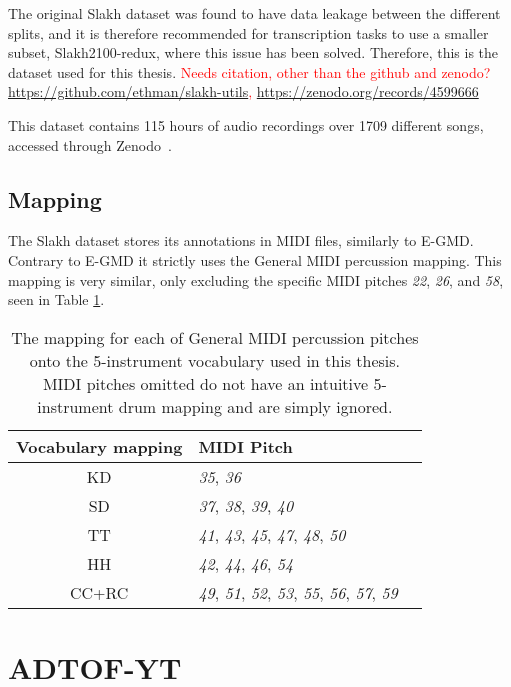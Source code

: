 The original Slakh dataset was found to have data leakage between the different splits, and it is therefore recommended for transcription tasks to use a smaller subset, Slakh2100-redux, where this issue has been solved. Therefore, this is the dataset used for this thesis.
\textcolor{red}{Needs citation, other than the github and zenodo? \\ \url{https://github.com/ethman/slakh-utils}, \url{https://zenodo.org/records/4599666}}

This dataset contains 115 hours of audio recordings over 1709 different songs, accessed through Zenodo~\cite{manilow_2019_4599666}.

\subsection{Mapping}

The Slakh dataset stores its annotations in MIDI files, similarly to E-GMD. Contrary to E-GMD it strictly uses the General MIDI percussion mapping. This mapping is very similar, only excluding the specific MIDI pitches \textit{22}, \textit{26}, and \textit{58}, seen in Table \ref{MIDIMapping}.

\begin{table}[H]
    \centering
    \hspace*{-0.6cm}
    \begin{tabular}{c|ll}
        Vocabulary mapping & MIDI Pitch \\
        \hline
        \acrfull{KD} & \textit{35}, \textit{36} \\
        \acrfull{SD} & \textit{37}, \textit{38}, \textit{39}, \textit{40} \\
        \acrfull{TT} & \textit{41}, \textit{43}, \textit{45}, \textit{47}, \textit{48}, \textit{50} \\
        \acrfull{HH} & \textit{42}, \textit{44}, \textit{46}, \textit{54} \\
        \acrfull{CC+RC} & \textit{49}, \textit{51}, \textit{52}, \textit{53}, \textit{55}, \textit{56}, \textit{57}, \textit{59} \\
    \end{tabular}
    \caption{The mapping for each of General MIDI percussion pitches onto the 5-instrument vocabulary used in this thesis. MIDI pitches omitted do not have an intuitive 5-instrument drum mapping and are simply ignored.}
    \label{MIDIMapping}
\end{table}

\section{ADTOF-YT}

